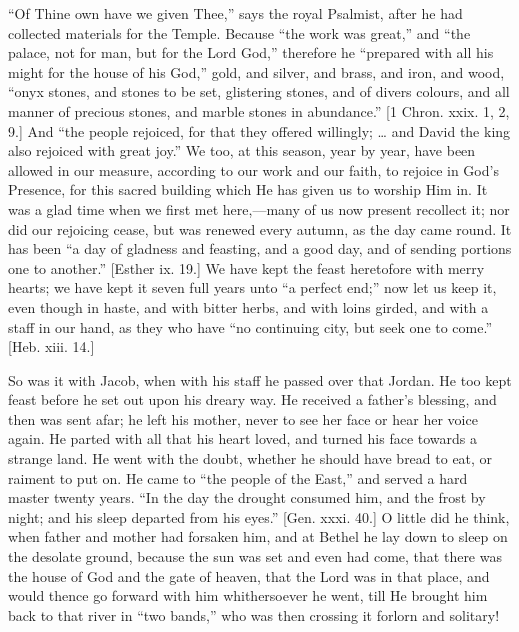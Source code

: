 ``Of Thine own have we given Thee,'' says the royal
Psalmist, after he had collected materials for the Temple. Because
``the work was great,'' and ``the palace, not for man, but
for the Lord God,'' therefore he ``prepared with all his might
for the house of his God,'' gold, and silver, and brass, and iron,
and wood, ``onyx stones, and stones to be set, glistering stones,
and of divers colours, and all manner of precious stones, and marble
stones in abundance.'' [1 Chron. xxix. 1, 2, 9.] And ``the
people rejoiced, for that they offered willingly; … and David the
king also rejoiced with great joy.'' We too, at this season, year
by year, have been allowed in our measure, according to our work and
our faith, to rejoice in God's Presence, for this sacred building
which He has given us to worship Him in. It was a glad time when we
first met here,—many of us now present recollect it; nor did our
rejoicing cease, but was renewed every autumn, as the day came round.
It has been ``a day of gladness and feasting, and a good day, and
of sending portions one to another.'' [Esther ix. 19.] We have
kept the feast heretofore with merry hearts; we have kept it seven
full years unto ``a perfect end;'' now let us keep it, even
though in haste, and with bitter herbs, and with loins girded, and
with a staff in our hand, as they who have ``no continuing city,
but seek one to come.'' [Heb. xiii. 14.]

So was it with Jacob, when with his staff he passed over that
Jordan. He too kept feast before he set out upon his dreary way. He
received a father's blessing, and then was sent afar; he left his
mother, never to see her face or hear her voice again. He parted with
all that his heart loved, and turned his face towards a strange land.
He went with the doubt, whether he should have bread to eat, or
raiment to put on. He came to ``the people of the East,'' and
served a hard master twenty years. ``In the day the drought
consumed him, and the frost by night; and his sleep departed from his
eyes.'' [Gen. xxxi. 40.] O little did he think, when father and
mother had forsaken him, and at Bethel he lay down to sleep on the
desolate ground, because the sun was set and even had come, that there
was the house of God and the gate of heaven, that the Lord was in that
place, and would thence go forward with him whithersoever he went,
till He brought him back to that river in ``two bands,'' who
was then crossing it forlorn and solitary!

